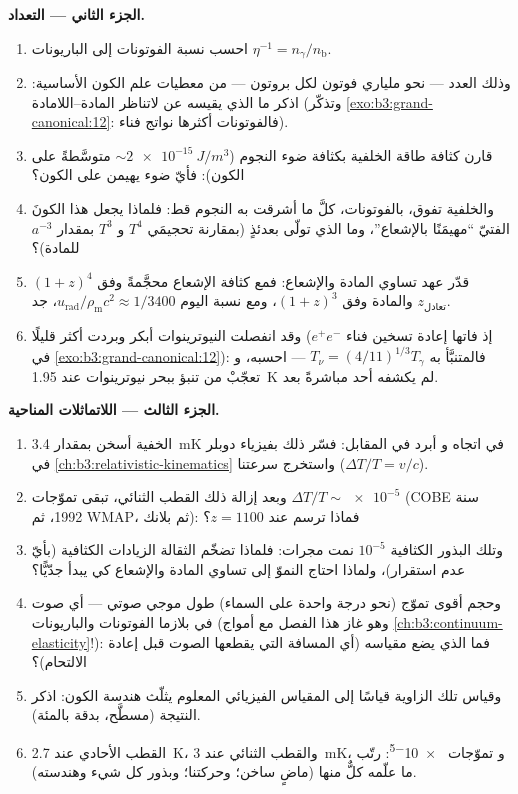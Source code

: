 \begin{problem}
\medskip\noindent\textbf{الجزء الثاني --- التعداد.}
\begin{enumerate}[resume]
  \item احسب نسبة الفوتونات إلى الباريونات $\eta^{-1} =
        n_\gamma/n_{\text{b}}$.
  \item وذلك العدد --- نحو ملياري فوتون لكل بروتون ---
        من معطيات علم الكون الأساسية: اذكر ما الذي يقيسه
        عن لاتناظر المادة--اللامادة (وتذكّر
        \cref{exo:b3:grand-canonical:12}: فالفوتونات أكثرها
        نواتج فناء).
  \item قارن كثافة طاقة الخلفية بكثافة ضوء النجوم
        ($\sim\qty{2e-15}{J/m^3}$ متوسَّطةً على الكون):
        فأيّ ضوء يهيمن على الكون؟
  \item والخلفية تفوق، بالفوتونات، كلَّ ما أشرقت به النجوم
        قط: فلماذا يجعل هذا الكونَ الفتيّ
        ``مهيمَنًا بالإشعاع''، وما الذي تولّى بعدئذٍ (بمقارنة
        تحجيمَي $T^4$ و $T^3$ بمقدار $a^{-3}$ للمادة)؟
  \item قدّر عهد تساوي المادة والإشعاع: فمع كثافة
        الإشعاع محجَّمةً وفق $(1+z)^4$ والمادة وفق
        $(1+z)^3$، ومع نسبة اليوم
        $u_{\text{rad}}/\rho_{\text{m}}c^2 \approx 1/3400$، جد
        $z_{\text{تعادل}}$.
  \item وقد انفصلت النيوترينوات أبكر وبردت أكثر قليلًا
        (إذ فاتها إعادة تسخين فناء $e^+e^-$ في
        \cref{exo:b3:grand-canonical:12}): فالمتنبَّأ به
        $T_\nu = (4/11)^{1/3}T_\gamma$ --- احسبه، و
        تعجّبْ من تنبؤ ببحر نيوترينوات عند \qty{1.95}{K}
        لم يكشفه أحد مباشرةً بعد.
\end{enumerate}

\medskip\noindent\textbf{الجزء الثالث --- اللاتماثلات المناحية.}
\begin{enumerate}[resume]
  \item الخفية أسخن بمقدار \qty{3.4}{mK} في اتجاه و
        أبرد في المقابل: فسّر ذلك بفيزياء دوبلر في
        \cref{ch:b3:relativistic-kinematics} واستخرج
        سرعتنا ($\Delta T/T = v/c$).
  \item وبعد إزالة ذلك القطب الثنائي، تبقى تموّجات $\Delta T/T \sim
        \num{e-5}$ (COBE سنة 1992، ثم WMAP، ثم بلانك): فماذا
        ترسم عند $z = 1100$؟
  \item وتلك البذور الكثافية $10^{-5}$ نمت مجرات: فلماذا
        تضخّم الثقالة الزيادات الكثافية (بأيّ عدم استقرار)،
        ولماذا احتاج النموّ إلى تساوي المادة والإشعاع كي يبدأ جدّيًّا؟
  \item وحجم أقوى تموّج (نحو درجة واحدة على السماء)
        طول موجي صوتي --- أي صوت في بلازما
        الفوتونات والباريونات (وهو غاز هذا الفصل مع
        أمواج \cref{ch:b3:continuum-elasticity}!): فما الذي يضع
        مقياسه (أي المسافة التي يقطعها الصوت قبل
        إعادة الالتحام)؟
  \item وقياس تلك الزاوية قياسًا إلى المقياس الفيزيائي المعلوم
        يثلّث هندسة الكون: اذكر
        النتيجة (مسطَّح، بدقة بالمئة).
  \item القطب الأحادي عند \qty{2.7}{K}، والقطب الثنائي عند \qty{3}{mK}، و
        تموّجات \num{e-5}: رتّب ما علّمه كلٌّ منها (ماضٍ ساخن؛
        وحركتنا؛ وبذور كل شيء وهندسته).
\end{enumerate}


\end{problem}
